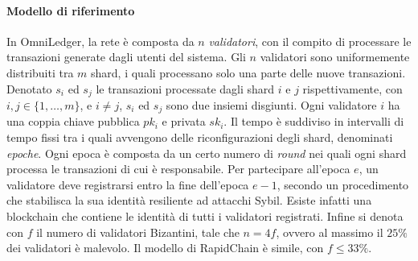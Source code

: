 \paragraph*{Modello di riferimento}
In OmniLedger, la rete è composta da $n$ \emph{validatori}, con il compito di processare le transazioni generate dagli utenti del sistema. Gli $n$ validatori sono uniformemente distribuiti tra $m$ shard, i quali processano solo una parte delle nuove transazioni. Denotato $s_i$ ed $s_j$ le transazioni processate dagli shard $i$ e $j$ rispettivamente, con $i, j \in \{1,\dots,m\}$, e $i \neq j$, $s_i$ ed $s_j$ sono due insiemi disgiunti. Ogni validatore $i$ ha una coppia chiave pubblica $pk_i$ e privata $sk_i$. Il tempo è suddiviso in intervalli di tempo fissi tra i quali avvengono delle riconfigurazioni degli shard, denominati \emph{epoche}. Ogni epoca è composta da un certo numero di \emph{round} nei quali ogni shard processa le transazioni di cui è responsabile. Per partecipare all'epoca $e$, un validatore deve registrarsi entro la fine dell'epoca $e-1$, secondo un procedimento che stabilisca la sua identità resiliente ad attacchi Sybil. Esiste infatti una blockchain che contiene le identità di tutti i validatori registrati. Infine si denota con $f$ il numero di validatori Bizantini, tale che $n = 4f$, ovvero al massimo il $25\%$ dei validatori è malevolo. Il modello di RapidChain è simile, con $f \leq 33\%$.

